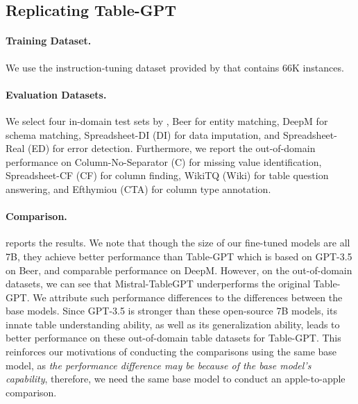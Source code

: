 \documentclass[11pt]{article}
\begin{document}
\subsection{Replicating Table-GPT}
\label{subsec: mistral-tablegpt}


\paragraph{Training Dataset.}
We use the instruction-tuning dataset provided by \citet{li2023table} that contains 66K instances.

\paragraph{Evaluation Datasets.}
We select four in-domain test sets by \citet{li2023table}, Beer for entity matching, DeepM for schema matching, Spreadsheet-DI (DI) for data imputation, and Spreadsheet-Real (ED) for error detection.
Furthermore, we report the out-of-domain performance on Column-No-Separator (C) for missing value identification, Spreadsheet-CF (CF) for column finding, WikiTQ (Wiki) for table question answering, and Efthymiou (CTA) for column type annotation.

\paragraph{Comparison.}

 reports the results.
We note that though the size of our fine-tuned models are all 7B, they achieve better performance than Table-GPT which is based on GPT-3.5 on Beer, and comparable performance on DeepM.
However, on the out-of-domain datasets, we can see that Mistral-TableGPT underperforms the original Table-GPT.
We attribute such performance differences to the differences between the base models.
Since GPT-3.5 is stronger than these open-source 7B models, its innate table understanding ability, as well as its generalization ability, leads to better performance on these out-of-domain table datasets for Table-GPT.
This reinforces our motivations of conducting the comparisons using the same base model, as \textit{the performance difference may be because of the base model's capability}, therefore, we need the same base model to conduct an apple-to-apple comparison.
\end{document}
